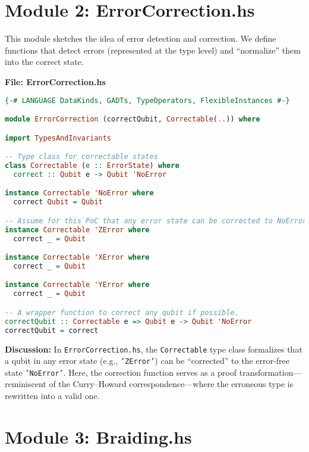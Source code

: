 \documentclass[12pt]{article}
\begin{document}
\newpage

\section{Module 2: ErrorCorrection.hs}

This module sketches the idea of error detection and correction. We define functions that detect errors (represented at the type level) and “normalize” them into the correct state.

\bigskip

\noindent\textbf{File: ErrorCorrection.hs}
\begin{lstlisting}[language=Haskell, caption={ErrorCorrection.hs}]
{-# LANGUAGE DataKinds, GADTs, TypeOperators, FlexibleInstances #-}

module ErrorCorrection (correctQubit, Correctable(..)) where

import TypesAndInvariants

-- Type class for correctable states
class Correctable (e :: ErrorState) where
  correct :: Qubit e -> Qubit 'NoError

instance Correctable 'NoError where
  correct Qubit = Qubit

-- Assume for this PoC that any error state can be corrected to NoError.
instance Correctable 'ZError where
  correct _ = Qubit

instance Correctable 'XError where
  correct _ = Qubit

instance Correctable 'YError where
  correct _ = Qubit

-- A wrapper function to correct any qubit if possible.
correctQubit :: Correctable e => Qubit e -> Qubit 'NoError
correctQubit = correct
\end{lstlisting}

\bigskip

\noindent\textbf{Discussion:}  
In \texttt{ErrorCorrection.hs}, the \texttt{Correctable} type class formalizes that a qubit in any error state (e.g., \texttt{'ZError'}) can be “corrected” to the error-free state \texttt{'NoError'}. Here, the correction function serves as a proof transformation—reminiscent of the Curry–Howard correspondence—where the erroneous type is rewritten into a valid one.

\newpage

\section{Module 3: Braiding.hs}
\end{document}
